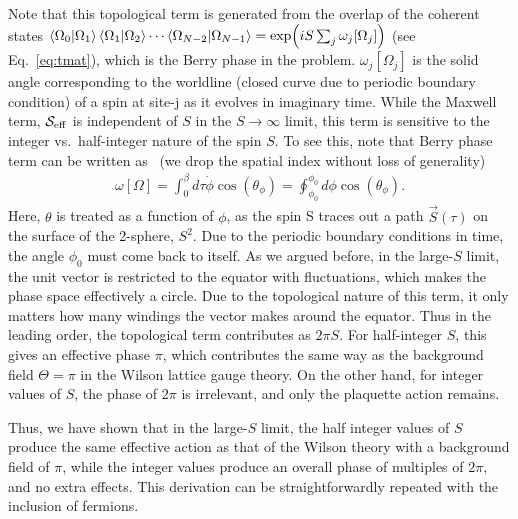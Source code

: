 \documentclass[aps,prl,reprint,twocolumn,superscriptaddress,floatfix,nofootinbib]{revtex4-1}
\begin{document}
Note that this topological term is generated from the overlap of the coherent states $\braket{\Omega_0 | \Omega_1} \braket{\Omega_1 | \Omega_2} \cdots \braket{\Omega_{N-2} | \Omega_{N-1}}= \exp(i S \sum_{j} \omega_j [\Omega_j])$ (see Eq.~{\eqref{eq:tmat}}), which is the Berry phase in the problem. $\omega_j [\Omega_j]$ is the solid angle corresponding to the worldline (closed curve due to periodic boundary condition) of a spin at site-j as it evolves in imaginary time. While the Maxwell term, ${\cal S}_{\rm eff}$ is independent of $S$ in the $S \to \infty$ limit, this term is sensitive to the integer vs.~half-integer nature of the spin $S$. To see this, note that Berry phase term can be written as~\cite{Berry1984} (we drop the spatial index without loss of generality)
\begin{align}
	\omega [\Omega] = \int_0^\beta d\tau \dot{\phi} \cos(\theta_\phi) = \oint_{\phi_0}^{\phi_0} d \phi \cos (\theta_\phi).
\end{align}
Here, $\theta$ is treated as a function of $\phi$, as the spin S traces out a path $\vec{S}(\tau)$ on the surface of the 2-sphere, $S^2$. Due to the periodic boundary conditions in time, the angle $\phi_0$ must come back to itself. As we argued before, in the large-$S$ limit, the unit vector is restricted to the equator with fluctuations, which makes the phase space effectively a circle. Due to the topological nature of this term, it only matters how many windings the vector makes around the equator. Thus in the leading order, the topological term contributes as $2 \pi  S$. For half-integer $S$, this gives an effective phase $\pi$, which contributes the same way as the background field $\Theta = \pi$ in the Wilson lattice gauge theory. On the other hand, for integer values of $S$, the phase of $2 \pi$ is irrelevant, and only the plaquette action remains.

Thus, we have shown that in the large-$S$ limit, the half integer values of $S$ produce the same effective action as that of the Wilson theory with a background field of $\pi$, while the integer values produce an overall phase of multiples of $2\pi$, and no extra effects. This derivation can be straightforwardly repeated with the inclusion of fermions.


%
\end{document}
